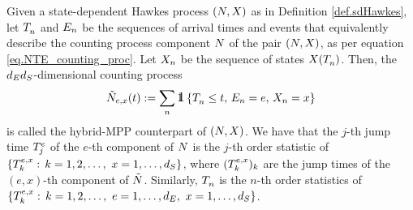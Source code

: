 \documentclass[10pt]{article}
\begin{document}
Given a state-dependent Hawkes process $(\multiCountingProc, \stateVariable)$ as in Definition \ref{def.sdHawkes}, let $\arrivalTimes[]_n$ and $\event[n]$ be the sequences of arrival times and events that equivalently describe the counting process component $\multiCountingProc$ of the pair $(\multiCountingProc, \stateVariable)$, as per equation \eqref{eq.NTE_counting_proc}. Let $\stateVariable_n$ be the sequence of states $X(\arrivalTimes[]_n)$. Then, the 
$\numEventTypes\numStates$-dimensional counting process
\begin{equation}\label{eq.hybridHawkes}
 \hybridHawkes_{e,x}(t) := 
 \sum_{n} \one \left\lbrace \arrivalTimes[]_n \leq t, \, \event[n] = e, \, 
 \stateVariable_n = x \right\rbrace
\end{equation}
is called the hybrid-MPP counterpart of  $(\multiCountingProc, \stateVariable)$.
We have that the $j$-th jump time $\arrivalTimes[e]_j$ of the $e$-th component of $\multiCountingProc$ is the $j$-th order statistic of $\lbrace \arrivalTimes[e,x]_k: \, k=1,2,\dots, \, \, x=1,\dots,\numStates \rbrace$, where $(\arrivalTimes[e,x]_k)_k$ are the jump times of the $(e,x)$-th component of $\hybridHawkes$. Similarly, $\arrivalTimes[]_n$ is the $n$-th order statistics of $\lbrace \arrivalTimes[e,x]_k: \, k=1,2,\dots, \, \, e=1,\dots, \numEventTypes, \, \,  x=1,\dots,\numStates \rbrace$.
\end{document}
